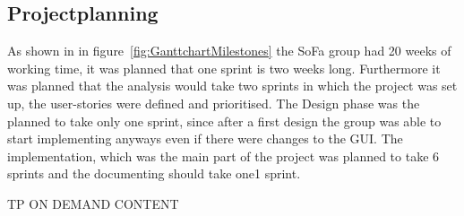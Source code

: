 \subsection{Projectplanning}
As shown in in figure~\ref{fig:GanttchartMilestones} the SoFa group had 20 weeks of working time, it was planned that one sprint is two weeks long. Furthermore it was planned that the analysis would take two sprints in which the project was set up, the user-stories were defined and prioritised. The Design phase was the planned to take only one sprint, since after a first design the group was able to start implementing anyways even if there were changes to the GUI.
The implementation, which was the main part of the project was planned to take 6 sprints and the documenting should take one1 sprint.


{\LARGE TP ON DEMAND CONTENT}